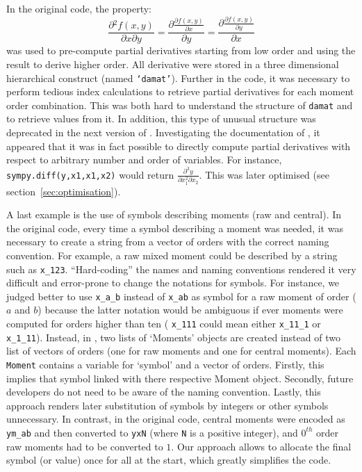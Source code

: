 In the original code, the property:
\begin{equation}
\label{eq:partial}
\frac{\partial{} ^ 2 f(x,y)}{\partial x \partial y} =
\frac{\partial{} \frac{\partial{} f(x,y)}{\partial x}}{\partial y} =
\frac{\partial{} \frac{\partial{} f(x,y)}{\partial{} y}}{\partial{} x}
\end{equation}
was used to pre-compute partial derivatives starting from low order and using the result to derive higher order.
All derivative were stored in a three dimensional hierarchical construct (named \texttt{`damat'}).
Further in the code, it was necessary to perform  tedious index calculations to
retrieve partial derivatives for each moment order combination.
This was both hard to understand the structure of \texttt{damat} and to retrieve values from it.
In addition, this type of unusual structure was deprecated in the next version of \sympy{}.
Investigating the documentation of \sympy, it appeared that it was in fact possible to directly compute partial derivatives
with respect to arbitrary number and order of variables.
For instance, \texttt{sympy.diff(y,x1,x1,x2)} would return $\frac{\partial^3 y}{\partial x_1^2 \partial x_2}$.
This was later optimised (see section~\ref{sec:optimisation}).

A last example is the use of symbols describing moments (raw and central). In the original code,
every time a symbol describing a moment was needed, it was necessary to create a string from a vector of orders with the correct naming convention.
For example, a raw mixed moment could be described by a string such as \verb"x_123".
``Hard-coding'' the names and naming conventions rendered it very difficult and error-prone to change the notations for symbols.
For instance, we judged better to use \verb"x_a_b" instead of \verb"x_ab" as symbol for a raw moment of order ($a$ and $b$)
because the latter notation would be ambiguous if ever moments were computed for orders higher than ten (\eg{} \verb"x_111" could mean either \verb"x_11_1"  or \verb"x_1_11").
Instead, in \means, two lists of `Moments' objects are created instead of two list of vectors of orders (one for raw moments and one for central moments).
Each \texttt{Moment} contains a variable for `symbol' and a vector of orders.
Firstly, this implies that symbol linked with there respective Moment object.
Secondly, future developers do not need to be aware of the naming convention.
Lastly, this approach renders later substitution of symbols by integers or other symbols unnecessary.
In contrast, in the original code, central moments were encoded as \verb"ym_ab" and then
converted to \verb"yxN" (where \verb"N"  is a positive integer),
and $0^{th}$ order raw moments had to be converted to $1$.
Our approach allows to allocate the final symbol (or value) once for all at the start, which greatly simplifies the code.

